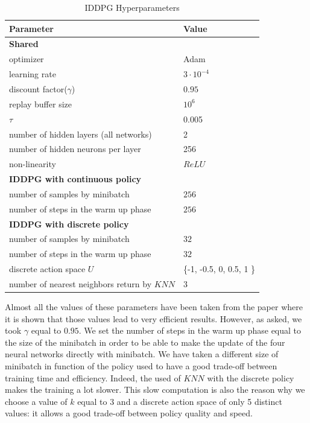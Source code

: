 {\centering
\begin{minipage}{.6\linewidth}
\begin{table}[H]
    \begin{tabular}{l|l}
        \hline
         Parameter & Value \\
         \hline
         \hline
         \textbf{Shared} & \\
         optimizer & Adam \cite{adam} \\
         learning rate & $3 \cdot 10^{-4}$ \\
         discount factor($\gamma$) & $0.95$ \\
         replay buffer size & $10^6$ \\
         $\tau$ & 0.005 \\
         number of hidden layers (all networks) & 2 \\
         number of hidden neurons per layer & 256 \\
         non-linearity & $ReLU$ \\
         \hline
         \textbf{IDDPG with continuous policy} & \\
         number of samples by minibatch & $256$ \\
         number of steps in the warm up phase & $256$ \\
         \hline
         \textbf{IDDPG with discrete policy} & \\
         number of samples by minibatch & $32$ \\
         number of steps in the warm up phase & $32$ \\
         discrete action space $U$ & \{-1, -0.5, 0, 0.5, 1 \} \\
         number of nearest neighbors return by $KNN$ & 3 \\
         \hline
    \end{tabular}
    \caption{IDDPG Hyperparameters}
    \label{tab:para}
\end{table}
\end{minipage}
\par
} 
\vspace{0.7cm}

Almost all the values of these parameters have been taken from the paper \cite{sac} where it is shown that those values lead to very efficient results. However, as asked, we took $\gamma$ equal to $0.95$. We set the number of steps in the warm up phase equal to the size of the minibatch in order to be able to make the update of the four neural networks directly with minibatch. We have taken a different size of minibatch in function of the policy used to have a good trade-off between training time and efficiency. Indeed, the used of $KNN$ with the discrete policy makes the training a lot slower. This slow computation is also the reason why we choose a value of $k$ equal to $3$ and a discrete action space of only 5 distinct values: it allows a good trade-off between policy quality and speed.

